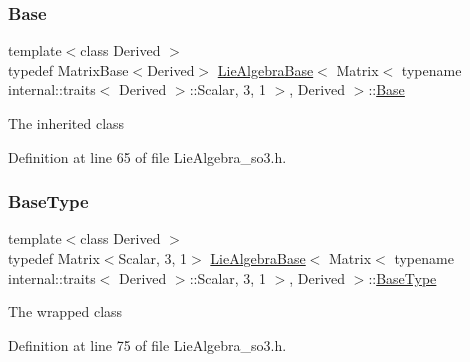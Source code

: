 \subsubsection{\texorpdfstring{Base}{Base}}
{\footnotesize\ttfamily template$<$class Derived $>$ \\
typedef Matrix\+Base$<$Derived$>$ \hyperlink{class_lie_algebra_base}{Lie\+Algebra\+Base}$<$ Matrix$<$ typename internal\+::traits$<$ Derived $>$\+::Scalar, 3, 1 $>$, Derived $>$\+::\hyperlink{class_lie_algebra_base_3_01_matrix_3_01typename_01internal_1_1traits_3_01_derived_01_4_1_1_scalabfa0bdce6d9781ee940346c3f6d91f4e_a732476e0ccd5638bf791f9f7a4c59f26}{Base}\hspace{0.3cm}{\ttfamily [protected]}}

The inherited class 

Definition at line 65 of file Lie\+Algebra\+\_\+so3.\+h.

\hypertarget{class_lie_algebra_base_3_01_matrix_3_01typename_01internal_1_1traits_3_01_derived_01_4_1_1_scalabfa0bdce6d9781ee940346c3f6d91f4e_a2191d421225a2c966825db324301abba}{}\label{class_lie_algebra_base_3_01_matrix_3_01typename_01internal_1_1traits_3_01_derived_01_4_1_1_scalabfa0bdce6d9781ee940346c3f6d91f4e_a2191d421225a2c966825db324301abba} 
\subsubsection{\texorpdfstring{Base\+Type}{BaseType}}
{\footnotesize\ttfamily template$<$class Derived $>$ \\
typedef Matrix$<$Scalar, 3, 1$>$ \hyperlink{class_lie_algebra_base}{Lie\+Algebra\+Base}$<$ Matrix$<$ typename internal\+::traits$<$ Derived $>$\+::Scalar, 3, 1 $>$, Derived $>$\+::\hyperlink{class_lie_algebra_base_3_01_matrix_3_01typename_01internal_1_1traits_3_01_derived_01_4_1_1_scalabfa0bdce6d9781ee940346c3f6d91f4e_a2191d421225a2c966825db324301abba}{Base\+Type}}

The wrapped class 

Definition at line 75 of file Lie\+Algebra\+\_\+so3.\+h.


